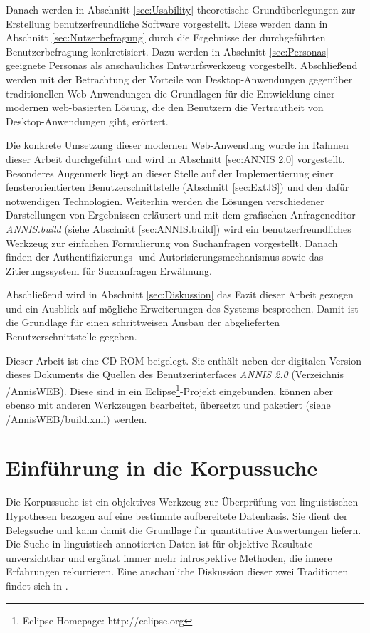 Danach werden in Abschnitt \ref{sec:Usability} theoretische Grundüberlegungen zur Erstellung benutzerfreundliche Software vorgestellt. Diese werden dann in Abschnitt \ref{sec:Nutzerbefragung} durch die Ergebnisse der durchgeführten Benutzerbefragung konkretisiert. Dazu werden in Abschnitt \ref{sec:Personas} geeignete Personas als anschauliches Entwurfswerkzeug vorgestellt. Abschließend werden mit der Betrachtung der Vorteile von Desktop-Anwendungen gegenüber traditionellen Web-Anwendungen die Grundlagen für die Entwicklung einer modernen web-basierten Lösung, die den Benutzern die Vertrautheit von Desktop-Anwendungen gibt, erörtert. 

Die konkrete Umsetzung dieser modernen Web-Anwendung wurde im Rahmen dieser Arbeit durchgeführt und wird in Abschnitt \ref{sec:ANNIS 2.0} vorgestellt. Besonderes Augenmerk liegt an dieser Stelle auf der Implementierung einer fensterorientierten Benutzerschnittstelle (Abschnitt \ref{sec:ExtJS}) und den dafür notwendigen Technologien. Weiterhin werden die Lösungen verschiedener Darstellungen von Ergebnissen erläutert und mit dem grafischen Anfrageneditor \emph{ANNIS.build} (siehe Abschnitt \ref{sec:ANNIS.build}) wird ein benutzerfreundliches Werkzeug zur einfachen Formulierung von Suchanfragen vorgestellt. Danach finden der Authentifizierungs- und Autorisierungsmechanismus sowie das Zitierungssystem für Suchanfragen Erwähnung. 

Abschließend wird in Abschnitt \ref{sec:Diskussion} das Fazit dieser Arbeit gezogen und ein Ausblick auf mögliche Erweiterungen des Systems besprochen. Damit ist die Grundlage für einen schrittweisen Ausbau der abgelieferten Benutzerschnittstelle gegeben.

Dieser Arbeit ist eine CD-ROM beigelegt. Sie enthält neben der digitalen Version dieses Dokuments die Quellen des Benutzerinterfaces \emph{ANNIS 2.0} (Verzeichnis /AnnisWEB). Diese sind in ein Eclipse\footnote{Eclipse Homepage: http://eclipse.org}-Projekt eingebunden, können aber ebenso mit anderen Werkzeugen bearbeitet, übersetzt und paketiert (siehe /AnnisWEB/build.xml) werden.

\newpage
\section{Einführung in die Korpussuche}\label{sec:Korpussuche}

Die Korpussuche ist ein objektives Werkzeug zur Überprüfung von linguistischen Hypothesen bezogen auf eine bestimmte aufbereitete Datenbasis. Sie dient der Belegsuche und kann damit die Grundlage für quantitative Auswertungen liefern. Die Suche in linguistisch annotierten Daten ist für objektive Resultate unverzichtbar und ergänzt immer mehr introspektive Methoden, die innere Erfahrungen rekurrieren. Eine anschauliche Diskussion dieser zwei Traditionen findet sich in \cite{fillmore1992armchair}.

